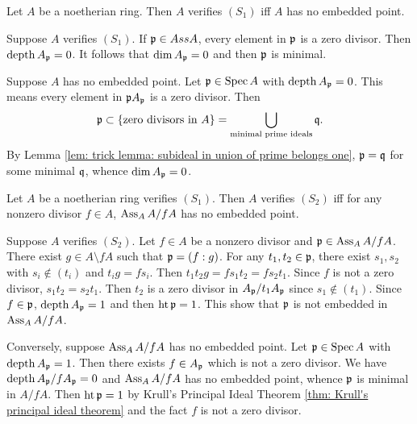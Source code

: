     \begin{example}\label{eg: S_1 is equivalent to A has no embedded point}
        Let $A$ be a noetherian ring.
        Then $A$ verifies $(S_1)$ iff $A$ has no embedded point.
        
        Suppose $A$ verifies $(S_1)$.
        If ${\mathfrak{p}} \in Ass A$, every element in ${\mathfrak{p}}$ is a zero divisor.
        Then $\operatorname{depth} A_{{\mathfrak{p}}} = 0$.
        It follows that $\dim A_{\mathfrak{p}} = 0$ and then ${\mathfrak{p}}$ is minimal. 

        Suppose $A$ has no embedded point.
        Let ${\mathfrak{p}} \in \operatorname{Spec} A$ with $\operatorname{depth} A_{\mathfrak{p}} = 0$.
        This means every element in ${\mathfrak{p}} A_{\mathfrak{p}}$ is a zero divisor.
        Then 
        \[ {\mathfrak{p}} \subset \{\text{zero divisors in } A\} = \bigcup_{\text{minimal prime ideals}} {\mathfrak{q}}. \]
        By Lemma \ref{lem: trick lemma: subideal in union of prime belongs one}, ${\mathfrak{p}} = {\mathfrak{q}}$ for some minimal ${\mathfrak{q}}$, whence $\dim A_{\mathfrak{p}} = 0$. 
    \end{example}

    \begin{example}\label{eg: S_2 is equivalent to A/fA has no embedded point}
        Let $A$ be a noetherian ring verifies $(S_1)$.
        Then $A$ verifies $(S_2)$ iff for any nonzero divisor $f \in A$, $\operatorname{Ass}_A A/fA$ has no embedded point.

        Suppose $A$ verifies $(S_2)$.
        Let $f \in A$ be a nonzero divisor and ${\mathfrak{p}} \in \operatorname{Ass}_A A/fA$.
        There exist $g \in A \setminus fA$ such that ${\mathfrak{p}} = (f:g)$.
        For any $t_1,t_2 \in {\mathfrak{p}}$, there exist $s_1,s_2$ with $s_i \notin (t_i)$ and $t_i g = f s_i$.
        Then $t_1t_2g = fs_1t_2 = fs_2t_1$.
        Since $f$ is not a zero divisor, $s_1t_2 = s_2t_1$.
        Then $t_2$ is a zero divisor in $A_{\mathfrak{p}}/t_1 A_{\mathfrak{p}}$ since $s_1 \notin (t_1)$.
        Since $f \in {\mathfrak{p}}$, $\operatorname{depth} A_{\mathfrak{p}} = 1$ and then $\operatorname{ht} {\mathfrak{p}} = 1$.
        This show that ${\mathfrak{p}}$ is not embedded in $\operatorname{Ass}_A A/fA$.
        
        Conversely, suppose $\operatorname{Ass}_A A/fA$ has no embedded point.
        Let ${\mathfrak{p}} \in \operatorname{Spec} A$ with $\operatorname{depth} A_{{\mathfrak{p}}} = 1$.
        Then there exists $f \in A_{{\mathfrak{p}}}$ which is not a zero divisor.
        We have $\operatorname{depth} A_{{\mathfrak{p}}}/fA_{\mathfrak{p}} = 0$ and $\operatorname{Ass}_A A/fA$ has no embedded point, whence ${\mathfrak{p}}$ is minimal in $A/fA$.
        Then $\operatorname{ht} {\mathfrak{p}} = 1$ by Krull's Principal Ideal Theorem \ref{thm: Krull's principal ideal theorem} and the fact $f$ is not a zero divisor.
    \end{example}

